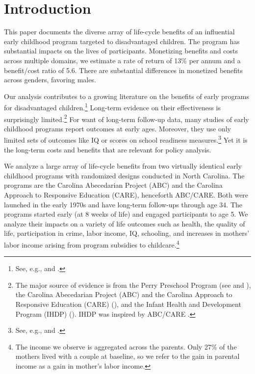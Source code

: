 \clearpage

\restoregeometry
\doublespacing

\setcounter{page}{0}

\section{Introduction}

This paper documents the diverse array of life-cycle benefits of an influential early childhood program targeted to disadvantaged children. The program has substantial impacts on the lives of participants. Monetizing benefits and costs across multiple domains, we estimate a rate of return of 13\% per annum and a benefit/cost ratio of 5.6. There are substantial differences in monetized benefits across genders, favoring males.

Our analysis contributes to a growing literature on the benefits of early programs for disadvantaged children.\footnote{See, e.g., \cite{Currie_2011_AER} and \cite{Elango_Hojman_etal_2016_Early-Edu}.} Long-term evidence on their effectiveness is surprisingly limited.\footnote{The major source of evidence is from the Perry Preschool Program (see \citealp{Schweinhart_Montie_ea_2005_BOOKlifetime} and \citealp{Heckman_Moon_etal_2010_RateofReturn,Heckman_Moon_etal_2010_QE}), the Carolina Abecedarian Project (ABC) and the Carolina Approach to Responsive Education (CARE) (\citealp{Ramey_Campbell_etal_2000_ADS,Ramey-etal_2012-ABC}), and the Infant Health and Development Program (IHDP) (\citealp{Gross_Spiker_etal_1997_BOOKHelpinglowbirth,Duncan_Sojourner_2013_JHR}). IHDP was inspired by ABC/CARE \citep[][]{Gross_Spiker_etal_1997_BOOKHelpinglowbirth}.} For want of long-term follow-up data, many studies of early childhood programs report outcomes at early ages. Moreover, they use only limited sets of outcomes like IQ or scores on school readiness measures.\footnote{See, e.g., \cite{Kline_Walters_2016_QJE} and \cite{Weiland_2013_CD_Impacts-of-Pre-K}.} Yet it is the long-term costs and benefits that are relevant for policy analysis.

We analyze a large array of life-cycle benefits from two virtually identical early childhood programs with randomized designs conducted in North Carolina. The programs are the Carolina Abecedarian Project (ABC) and the Carolina Approach to Responsive Education (CARE), henceforth ABC/CARE. Both were launched in the early 1970s and have long-term follow-ups through age 34. The programs started early (at 8 weeks of life) and engaged participants to age 5. We analyze their impacts on a variety of life outcomes such as health, the quality of life, participation in crime, labor income, IQ, schooling, and increases in mothers' labor income arising from program subsidies to childcare.\footnote{The income we observe is aggregated across the parents. Only 27\% of the mothers lived with a couple at baseline, so we refer to the gain in parental income as a gain in mother's labor income.}

